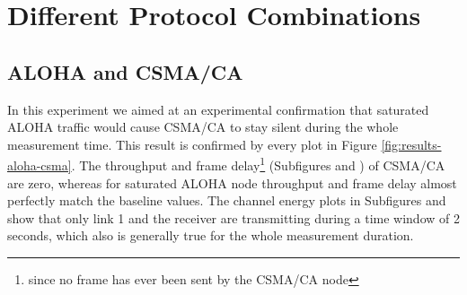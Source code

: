 \clearpage

\section{Different Protocol Combinations}
\label{sec:different-protocols}

\subsection{ALOHA and CSMA/CA}
\label{sec:aloha-csma}

In this experiment we aimed at an experimental confirmation that saturated ALOHA traffic would cause CSMA/CA to stay silent during the whole measurement time. This result is confirmed by every plot in Figure \ref{fig:results-aloha-csma}. The throughput and frame delay\footnote{since no frame has ever been sent by the CSMA/CA node} (Subfigures  and ) of CSMA/CA are zero, whereas for saturated ALOHA node throughput and frame delay almost perfectly match the baseline values. The channel energy plots in Subfigures  and  show that only link 1 and the receiver are transmitting during a time window of 2 seconds, which also is generally true for the whole measurement duration. 


